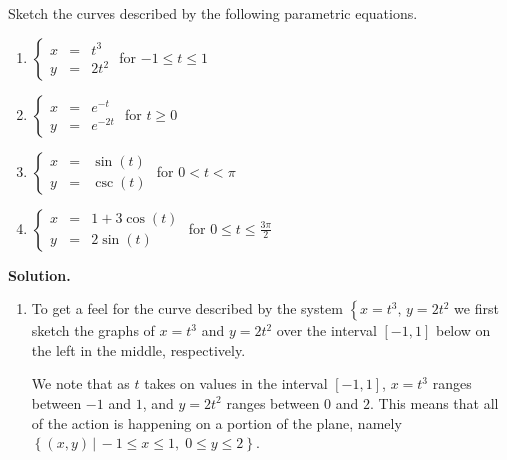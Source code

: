 \documentclass{ximera}
\begin{document}
\begin{ex} \label{parametrictorect}  Sketch the curves described by the following parametric equations.  

\begin{multicols}{2}

\begin{enumerate}

\item  $\left\{ \begin{array}{rcl} x & = & t^3 \\ y & = & 2t^2 \end{array} \right.$ for $-1 \leq t \leq 1$
\item  $\left\{ \begin{array}{rcl} x & = & e^{-t} \\ y & = & e^{-2t} \end{array} \right.$ for $t \geq 0$
\item \label{parametric1overx} $\left\{ \begin{array}{rcl} x & = & \sin(t) \\ y & = & \csc(t) \end{array} \right.$ for $0 < t < \pi$
\item  \label{parametricellipse} $\left\{ \begin{array}{rcl} x & = & 1 + 3\cos(t) \\ y & = & 2\sin(t) \end{array} \right.$ for $0 \leq t \leq \frac{3\pi}{2}$
  

\end{enumerate}

\end{multicols}

{\bf Solution.}

\begin{enumerate}

\item  To get a feel for the curve described by the system $\left\{ x = t^3, \, y = 2t^2 \right.$ we first sketch the graphs of $x = t^3$ and $y =  2t^2$ over the interval $[-1,1]$ below on the left in the middle, respectively.

\smallskip

We note that as $t$ takes on values in the interval $[-1,1]$, $x = t^3$ ranges between $-1$ and $1$, and $y =  2t^2$ ranges between $0$ and $2$.    This means that all of the action is happening on a portion of the plane, namely $\left\{ (x,y) \, | \, -1 \leq x \leq 1, \; 0 \leq y \leq 2 \right\}$.  


\end{enumerate}
\end{ex}
\end{document}
